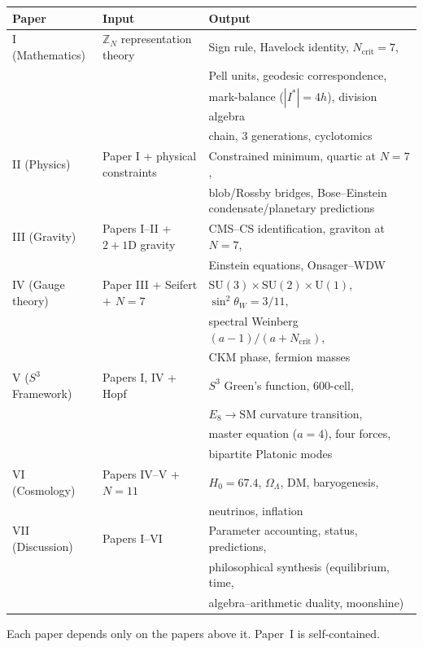 \begin{center}
\small
\begin{tabular}{lll}
\toprule
Paper & Input & Output \\
\midrule
I (Mathematics) & $\mathbb{Z}_N$ representation theory &
  Sign rule, Havelock identity, $N_{\mathrm{crit}} = 7$, \\
  & & Pell units, geodesic correspondence, \\
  & & mark-balance ($|I^*|{=}4h$), division algebra \\
  & & chain, $3$ generations, cyclotomics \\[3pt]
II (Physics) & Paper I + physical constraints &
  Constrained minimum, quartic at $N = 7$, \\
  & & blob/Rossby bridges, Bose--Einstein condensate/planetary predictions \\[3pt]
III (Gravity) & Papers I--II + $2{+}1$D gravity &
  CMS--CS identification, graviton at $N = 7$, \\
  & & Einstein equations, Onsager--WDW \\[3pt]
IV (Gauge theory) & Paper III + Seifert $+$ $N = 7$ &
  $\mathrm{SU}(3){\times}\mathrm{SU}(2){\times}\mathrm{U}(1)$,
  $\sin^2\theta_W = 3/11$, \\
  & & spectral Weinberg $(a{-}1)/(a{+}N_{\mathrm{crit}})$, \\
  & & CKM phase, fermion masses \\[3pt]
V ($S^3$ Framework) & Papers I, IV + Hopf &
  $S^3$ Green's function, 600-cell, \\
  & & $E_8 \to \mathrm{SM}$ curvature transition, \\
  & & master equation ($a{=}4$), four forces, \\
  & & bipartite Platonic modes \\[3pt]
VI (Cosmology) & Papers IV--V + $N = 11$ &
  $H_0 = 67.4$, $\Omega_\Lambda$, DM, baryogenesis, \\
  & & neutrinos, inflation \\[3pt]
VII (Discussion) & Papers I--VI &
  Parameter accounting, status, predictions, \\
  & & philosophical synthesis (equilibrium, time, \\
  & & algebra--arithmetic duality, moonshine) \\
\bottomrule
\end{tabular}
\end{center}

\noindent
Each paper depends only on the papers above it.
Paper~I is self-contained.





